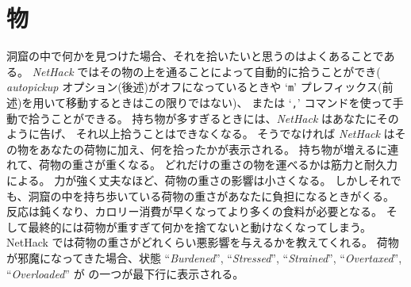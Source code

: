 \section{物}

洞窟の中で何かを見つけた場合、それを拾いたいと思うのはよくあることである。
{\it NetHack\/} ではその物の上を通ることによって自動的に拾うことができ(
{\it autopickup\/} オプション(後述)がオフになっているときや
`{\tt m}' プレフィックス(前述)を用いて移動するときはこの限りではない)、
または `{\tt ,}' コマンドを使って手動で拾うことができる。
持ち物が多すぎるときには、{\it NetHack\/} はあなたにそのように告げ、
それ以上拾うことはできなくなる。
そうでなければ {\it NetHack\/} はその物をあなたの荷物に加え、何を拾ったかが表示される。
持ち物が増えるに連れて、荷物の重さが重くなる。
どれだけの重さの物を運べるかは筋力と耐久力による。
力が強く丈夫なほど、荷物の重さの影響は小さくなる。
しかしそれでも、洞窟の中を持ち歩いている荷物の重さがあなたに負担になるときがくる。
反応は鈍くなり、カロリー消費が早くなってより多くの食料が必要となる。
そして最終的には荷物が重すぎて何かを捨てないと動けなくなってしまう。
NetHack では荷物の重さがどれくらい悪影響を与えるかを教えてくれる。
荷物が邪魔になってきた場合、状態
``{\it Burdened\/}'', ``{\it Stressed\/}'', ``{\it Strained\/}'',
``{\it Overtaxed\/}'', ``{\it Overloaded\/}'' が
の一つが最下行に表示される。

